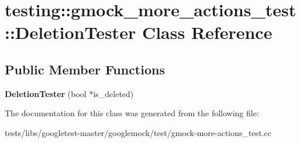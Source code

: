 \hypertarget{classtesting_1_1gmock__more__actions__test_1_1DeletionTester}{}\section{testing\+:\+:gmock\+\_\+more\+\_\+actions\+\_\+test\+:\+:Deletion\+Tester Class Reference}
\label{classtesting_1_1gmock__more__actions__test_1_1DeletionTester}
\subsection*{Public Member Functions}
\begin{DoxyCompactItemize}
\item 
\mbox{\label{classtesting_1_1gmock__more__actions__test_1_1DeletionTester_a3b9670fc6d29cb9d120fb0fdd2ba68d8}} 
{\bfseries Deletion\+Tester} (bool $\ast$is\+\_\+deleted)
\end{DoxyCompactItemize}


The documentation for this class was generated from the following file\+:\begin{DoxyCompactItemize}
\item 
tests/libs/googletest-\/master/googlemock/test/gmock-\/more-\/actions\+\_\+test.\+cc\end{DoxyCompactItemize}
